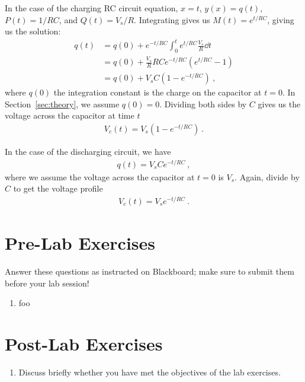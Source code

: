 \documentclass[12pt]{article}
\begin{document}
In the case of the charging RC circuit equation, $x = t$, $y(x) =
q(t)$, $P(t) = 1/RC$, and $Q(t) = V_s/R$.  Integrating gives us $M(t)
= e^{t/RC}$, giving us the solution:
\begin{align*}
  q(t) &= q(0) + e^{-t/RC} \int_0^t e^{t/RC} \frac{V_s}{R} \dd t\\
  &= q(0) + \frac{V_s}{R} RC e^{-t/RC} \left( e^{t/RC} -1 \right)\\
  &= q(0) + V_s C \left( 1 - e^{-t/RC} \right)\ ,
\end{align*}
where $q(0)$ the integration constant is the charge on the capacitor
at $t=0$.  In Section~\ref{sec:theory}, we assume $q(0)=0$.  Dividing
both sides by $C$ gives us the voltage across the capacitor at time
$t$
\begin{gather*}
  V_c(t) = V_s \left( 1 - e^{-t/RC} \right)\ .
\end{gather*}

In the case of the discharging circuit, we have 
\begin{gather*}
  q(t) = V_s C e^{-t/RC}\ ,
\end{gather*}
where we assume the voltage across the capacitor at $t=0$ is $V_s$.
Again, divide by $C$ to get the voltage profile
\begin{gather*}
  V_c(t) = V_s e^{-t/RC}\ .
\end{gather*}


\newpage

\section*{Pre-Lab Exercises}

Answer these questions as instructed on Blackboard; make sure to
submit them before your lab session!

\begin{enumerate}
\item foo
\end{enumerate}

\newpage

\section*{Post-Lab Exercises}

\begin{enumerate}
\item Discuss briefly whether you have met the objectives of the lab
  exercises.
\end{enumerate}
\end{document}

